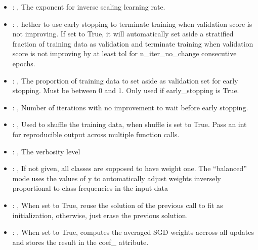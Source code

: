 \begin{itemize}
    \item {}: , 
      The exponent for inverse scaling learning rate.

    \item {}: , 
      hether to use early stopping to terminate training when validation score is not
      improving. If set to True, it will automatically set aside a stratified fraction of training
      data as validation and terminate training when validation score is not improving by at least
      tol for n\_iter\_no\_change consecutive epochs.

    \item {}: , 
      The proportion of training data to set aside as validation set for early stopping.
      Must be between 0 and 1. Only used if early\_stopping is True.

    \item {}: , 
      Number of iterations with no improvement to wait before early stopping.

    \item {}: , 
      Used to shuffle the training data, when shuffle is set to
      True. Pass an int for reproducible output across multiple function calls.

    \item {}: , 
      The verbosity level

    \item {}: \xmlDesc{[balanced]}, 
      If not given, all classes are supposed to have weight one.
      The “balanced” mode uses the values of y to automatically adjust weights
      inversely proportional to class frequencies in the input data

    \item {}: , 
      When set to True, reuse the solution of the previous call
      to fit as initialization, otherwise, just erase the previous solution.

    \item {}: , 
      When set to True, computes the averaged SGD weights accross
      all updates and stores the result in the coef\_ attribute.
  \end{itemize}


